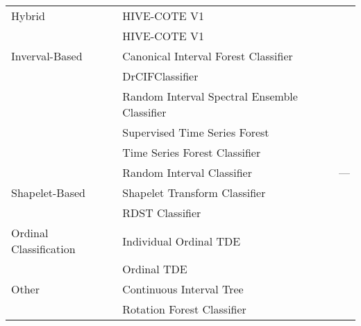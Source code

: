 \begin{table}
{\begin{tabular}{llc}
 		Hybrid			& HIVE-COTE V1				& \cite{HIVECOTEV1}\cite{HIVECOTEV2}\\
 					& HIVE-COTE V1				& \cite{HIVECOTEV2}		\\
 		Inverval-Based		& Canonical Interval Forest Classifier	& \cite{CanonicalIntervalForestClassifier}\\
 					& DrCIFClassifier			& \cite{HIVECOTEV2}		\\
 			& Random Interval Spectral Ensemble Classifier & \cite{RandomIntervalSpectralEnsembleClassifier}\\
 					& Supervised Time Series Forest		& \cite{SupervisedTimeSeriesForest}\\
 					& Time Series Forest Classifier		& \cite{TimeSeriesForestClassifier}\\
 					& Random Interval Classifier		& ---				\\
 		Shapelet-Based		& Shapelet Transform Classifier		& \cite{ShapeletTransformClassifier-1}\cite{ShapeletTransformClassifier-2}\\
 					& RDST Classifier			& \cite{RDSTClassifier-1}\cite{RDSTClassifier-2}\\
 		Ordinal Classification	& Individual Ordinal TDE		& \cite{OrdinalTDE}		\\
 					& Ordinal TDE				& \cite{OrdinalTDE}		\\
 		Other			& Continuous Interval Tree		& \cite{ContinuousIntervalTree}	\\
 					& Rotation Forest Classifier		& \cite{RotationForestClassifier}\\
		\bottomrule
	\end{tabular}
	}
	\label{tab:non_cv_list}
\end{table}
